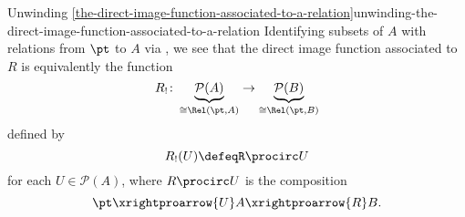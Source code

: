 \begin{remark}{Unwinding \cref{the-direct-image-function-associated-to-a-relation}}{unwinding-the-direct-image-function-associated-to-a-relation}%
    Identifying subsets of $A$ with relations from $\pt$ to $A$ via , we see that the direct image function associated to $R$ is equivalently the function
    \[
        R_{!}%
        \colon%
        \underbrace{\mathcal{P}(A)}_{\cong\Rel(\pt,A)}
        \to%
        \underbrace{\mathcal{P}(B)}_{\cong\Rel(\pt,B)}%
    \]%
    defined by
    \[
        R_{!}(U)%
        \defeq%
        R\procirc U%
    \]%
    for each $U\in\mathcal{P}(A)$, where $R\procirc U$ is the composition
    \[
        \pt%
        \xrightproarrow{U}%
        A%
        \xrightproarrow{R}%
        B.
    \]%
\end{remark}
